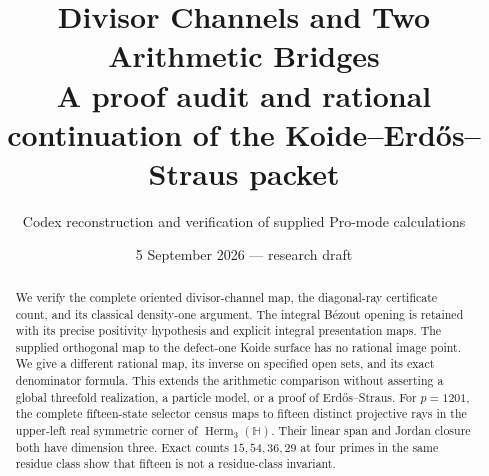 \documentclass[11pt]{article}
\title{Divisor Channels and Two Arithmetic Bridges\\
\large A proof audit and rational continuation of the Koide--Erd\H{o}s--Straus packet}
\author{Codex reconstruction and verification of supplied Pro-mode calculations}
\date{5 September 2026 --- research draft}
\theoremstyle{remark}
\begin{document}
\maketitle
\begin{abstract}
We verify the complete oriented divisor-channel map, the diagonal-ray
certificate count, and its classical density-one argument. The integral
B\'ezout opening is retained with its precise positivity hypothesis and
explicit integral presentation maps. The supplied orthogonal map to the
defect-one Koide surface has no rational image point. We give a different
rational map, its inverse on specified open sets, and its exact denominator
formula. This extends the arithmetic comparison without asserting a global
threefold realization, a particle model, or a proof of Erd\H{o}s--Straus.
For $p=1201$, the complete fifteen-state selector census maps to fifteen
distinct projective rays in the upper-left real symmetric corner of
$\operatorname{Herm}_3(\mathbb H)$. Their linear span and Jordan closure
both have dimension three. Exact counts $15,54,36,29$ at four primes in
the same residue class show that fifteen is not a residue-class invariant.
\end{abstract}


\end{document}

